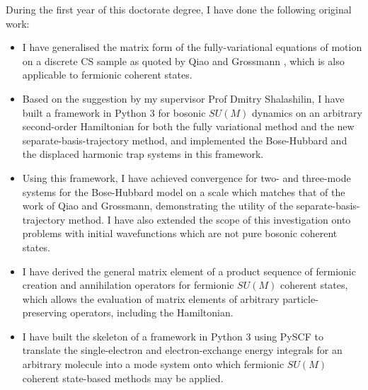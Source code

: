 \documentclass[12pt]{report}
\begin{document}
	During the first year of this doctorate degree, I have done the following original work:
	\begin{itemize}
	\item I have generalised the matrix form of the fully-variational equations of motion on a discrete CS sample as quoted by Qiao and Grossmann \cite[App. B]{grossmann}, which is also applicable to fermionic coherent states.
	\item Based on the suggestion by my supervisor Prof Dmitry Shalashilin, I have built a framework in Python 3 for bosonic $SU(M)$ dynamics on an arbitrary second-order Hamiltonian for both the fully variational method and the new separate-basis-trajectory method, and implemented the Bose-Hubbard and the displaced harmonic trap systems in this framework.
	\item Using this framework, I have achieved convergence for two- and three-mode systems for the Bose-Hubbard model on a scale which matches that of the work of Qiao and Grossmann, demonstrating the utility of the separate-basis-trajectory method. I have also extended the scope of this investigation onto problems with initial wavefunctions which are not pure bosonic coherent states.
	\item I have derived the general matrix element of a product sequence of fermionic creation and annihilation operators for fermionic $SU(M)$ coherent states, which allows the evaluation of matrix elements of arbitrary particle-preserving operators, including the Hamiltonian.
	\item I have built the skeleton of a framework in Python 3 using PySCF to translate the single-electron and electron-exchange energy integrals for an arbitrary molecule into a mode system onto which fermionic $SU(M)$ coherent state-based methods may be applied.
	\end{itemize}
	
\end{document}
